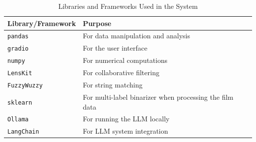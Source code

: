 \begin{table}[h!]
    \centering
    \begin{tabular}{lp{10cm}}
    \hline
    \textbf{Library/Framework} & \textbf{Purpose} \\ \hline
    \texttt{pandas} & For data manipulation and analysis \\ 
    \texttt{gradio} & For the user interface \\ 
    \texttt{numpy} & For numerical computations \\ 
    \texttt{LensKit} & For collaborative filtering \\ 
    \texttt{FuzzyWuzzy} & For string matching \\ 
    \texttt{sklearn} & For multi-label binarizer when processing the film data \\ 
    \texttt{Ollama} & For running the LLM locally \\ 
    \texttt{LangChain} & For LLM system integration \\ \hline
    \end{tabular}
    \caption{Libraries and Frameworks Used in the System}
    \label{tab:libraries_and_frameworks}
\end{table}
    